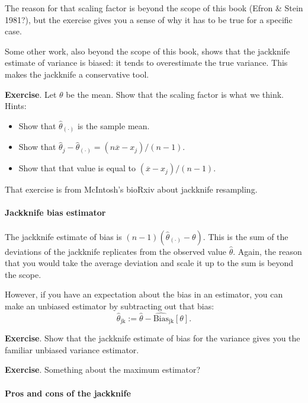 \documentclass{book}
\providecommand{\tightlist}{%
  \setlength{\itemsep}{0pt}\setlength{\parskip}{0pt}}
\begin{document}
The reason for that scaling factor is beyond the scope of this book
(Efron \& Stein 1981?), but the exercise gives you a sense of why it has
to be true for a specific case.

Some other work, also beyond the scope of this book, shows that the
jackknife estimate of variance is biased: it tends to overestimate the
true variance. This makes the jackknife a conservative tool.

\textbf{Exercise}. Let \(\theta\) be the mean. Show that the scaling
factor is what we think. Hints:

\begin{itemize}
\tightlist
\item
  Show that \(\hat{\theta}_{(\cdot)}\) is the sample mean.
\item
  Show that
  \(\hat{\theta}_j - \hat{\theta}_{(\cdot)} = (n \overline{x} - x_j) / (n - 1)\).
\item
  Show that that value is equal to \((\overline{x} - x_j) / (n - 1)\).
\end{itemize}

That exercise is from McIntosh's bioRxiv about jackknife resampling.

\paragraph{Jackknife bias estimator}\label{jackknife-bias-estimator}

The jackknife estimate of bias is
\((n-1) \left( \hat{\theta}_{(\cdot)} - \theta \right)\). This is the
sum of the deviations of the jackknife replicates from the observed
value \(\hat{\theta}\). Again, the reason that you would take the
average deviation and scale it up to the sum is beyond the scope.

However, if you have an expectation about the bias in an estimator, you
can make an unbiased estimator by subtracting out that bias: \[
\hat{\theta}_\mathrm{jk} := \hat{\theta} - \widehat{\mathrm{Bias}}_\mathrm{jk}[\theta].
\]

\textbf{Exercise}. Show that the jackknife estimate of bias for the
variance gives you the familiar unbiased variance estimator.

\textbf{Exercise}. Something about the maximum estimator?

\paragraph{Pros and cons of the
jackknife}\label{pros-and-cons-of-the-jackknife}
\end{document}
